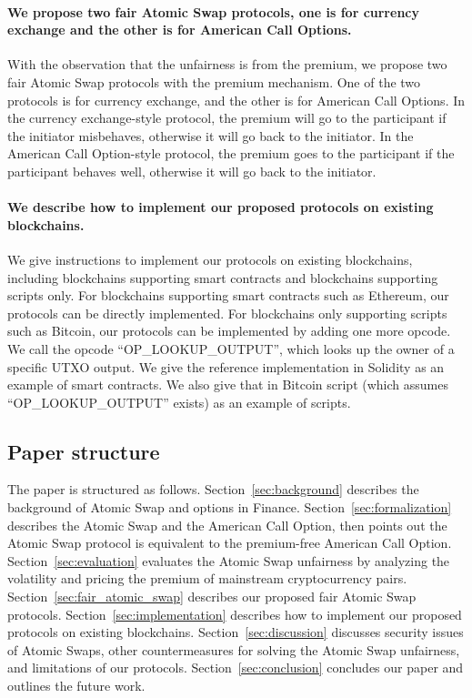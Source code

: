 \paragraph{We propose two fair Atomic Swap protocols, one is for currency exchange and the other is for American Call Options.}
With the observation that the unfairness is from the premium,
we propose two fair Atomic Swap protocols with the premium mechanism.
One of the two protocols is for currency exchange, and the other is for American Call Options.
In the currency exchange-style protocol, the premium will go to the participant if the initiator misbehaves, otherwise it will go back to the initiator.
In the American Call Option-style protocol, the premium goes to the participant if the participant behaves well, otherwise it will go back to the initiator.


\paragraph{We describe how to implement our proposed protocols on existing blockchains.}
We give instructions to implement our protocols on existing blockchains,
including blockchains supporting smart contracts and blockchains supporting scripts only.
For blockchains supporting smart contracts such as Ethereum, our protocols can be directly implemented.
For blockchains only supporting scripts such as Bitcoin, our protocols can be implemented by adding one more opcode.
We call the opcode ``OP\_LOOKUP\_OUTPUT'', which looks up the owner of a specific UTXO output.
We give the reference implementation in Solidity as an example of smart contracts.
We also give that in Bitcoin script (which assumes ``OP\_LOOKUP\_OUTPUT'' exists) as an example of scripts.










\subsection{Paper structure}

The paper is structured as follows.
Section~\ref{sec:background} describes the background of Atomic Swap and options in Finance.
Section~\ref{sec:formalization} describes the Atomic Swap and the American Call Option, then points out the Atomic Swap protocol is equivalent to the premium-free American Call Option.
Section~\ref{sec:evaluation} evaluates the Atomic Swap unfairness by analyzing the volatility and pricing the premium of mainstream cryptocurrency pairs.
Section~\ref{sec:fair_atomic_swap} describes our proposed fair Atomic Swap protocols.
Section~\ref{sec:implementation} describes how to implement our proposed protocols on existing blockchains.
Section~\ref{sec:discussion} discusses security issues of Atomic Swaps, other countermeasures for solving the Atomic Swap unfairness, and limitations of our protocols.
Section~\ref{sec:conclusion} concludes our paper and outlines the future work.
